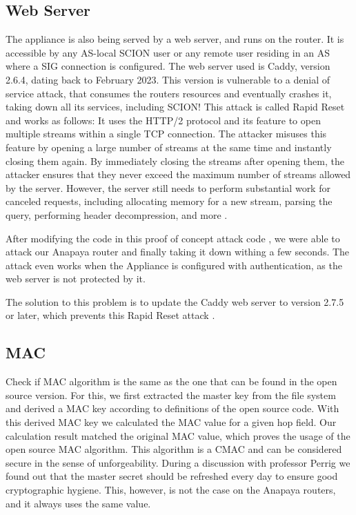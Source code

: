 \subsection{Web Server}
The appliance is also being served by a web server, and runs on the router.
It is accessible by any AS-local SCION user or any remote user residing in an AS where a SIG connection is configured.
The web server used is Caddy, version 2.6.4, dating back to February 2023.
This version is vulnerable to a denial of service attack, that consumes the routers resources and eventually crashes it, taking down all its services, including SCION!
This attack is called Rapid Reset and works as follows:
It uses the HTTP/2 protocol and its feature to open multiple streams within a single TCP connection.
The attacker misuses this feature by opening a large number of streams at the same time and instantly closing them again.
By immediately closing the streams after opening them, the attacker ensures that they never exceed the maximum number of streams allowed by the server.
However, the server still needs to perform substantial work for canceled requests, including allocating memory for a new stream, parsing the query, performing header decompression, and more \cite{googleWorksNovel}.

After modifying the code in this proof of concept attack code \cite{githubGitHubMicrictorhttp2rststream}, we were able to attack our Anapaya router and finally taking it down withing a few seconds.
The attack even works when the Appliance is configured with authentication, as the web server is not protected by it.

The solution to this problem is to update the Caddy web server to version 2.7.5 or later, which prevents this Rapid Reset attack \cite{githubReleasesCaddyservercaddy}.




\subsection{MAC}
Check if MAC algorithm is the same as the one that can be found in the open source version.
For this, we first extracted the master key from the file system and derived a MAC key according to definitions of the open source code.
With this derived MAC key we calculated the MAC value for a given hop field.
Our calculation result matched the original MAC value, which proves the usage of the open source MAC algorithm.
This algorithm is a CMAC and can be considered secure in the sense of unforgeability.
During a discussion with professor Perrig we found out that the master secret should be refreshed every day to ensure good cryptographic hygiene.
This, however, is not the case on the Anapaya routers, and it always uses the same value.


